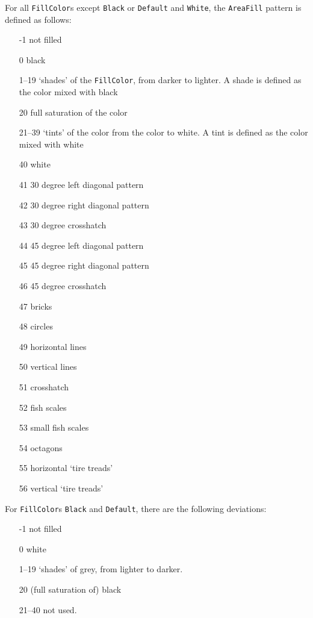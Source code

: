 \documentclass[10pt, a4paper]{article}
\begin{document}
For all \texttt{FillColor}s except \texttt{Black} or \texttt{Default} and \texttt{White}, 
the \texttt{AreaFill} pattern is defined as follows: 
%
\begin{enumerate}
\item[-1]    not filled
\item[0]     black
\item[1--19]  `shades' of the \texttt{FillColor}, from darker to lighter.
             A shade is defined as the color mixed with black
\item[20]    full saturation of the color
\item[21--39] `tints' of the color from the color to white.
             A tint is defined as the color mixed with white
\item[40]    white
\item[41]    30 degree left diagonal pattern
\item[42]    30 degree right diagonal pattern
\item[43]    30 degree crosshatch
\item[44]    45 degree left diagonal pattern
\item[45]    45 degree right diagonal pattern
\item[46]    45 degree crosshatch
\item[47]    bricks
\item[48]    circles
\item[49]    horizontal lines
\item[50]    vertical lines
\item[51]    crosshatch
\item[52]    fish scales
\item[53]    small fish scales
\item[54]    octagons
\item[55]    horizontal `tire treads'
\item[56]    vertical `tire treads'
\end{enumerate}

For \texttt{FillColor}s \texttt{Black} and \texttt{Default}, 
there are the following deviations: 
%
\begin{enumerate}
\item[-1]    not filled
\item[0]     white
\item[1--19]  `shades' of grey, from lighter to darker.
\item[20]    (full saturation of) black
\item[21--40] not used. 
\end{enumerate}
\end{document}
